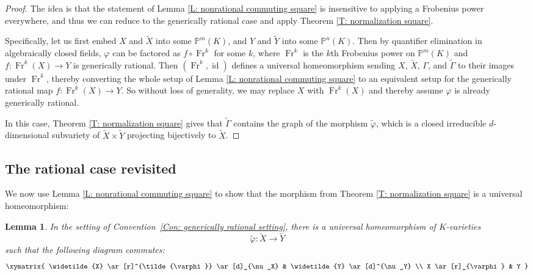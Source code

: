 \documentclass{amsart}
\newtheorem{lemma}[theorem]{Lemma}
\theoremstyle{definition}
\begin{document}
\begin{proof}
The idea is that the statement of Lemma \ref{L: nonrational commuting square} is insensitive to applying a Frobenius power everywhere, and thus we can reduce to the generically rational case and apply Theorem \ref{T: normalization square}.

Specifically, let us first embed $X$ and $\widetilde X$ into some $\mathbb P^m(K)$, and $Y$ and $\widetilde Y$ into some $\mathbb P^n(K)$. Then by quantifier elimination in algebraically closed fields, $\varphi$ can be factored as $f\circ\operatorname{Fr}^k$ for some $k$, where $\operatorname{Fr
}^k$ is the $k$th Frobenius power on $\mathbb P^m(K)$ and $f:\operatorname{Fr}^k(X)\rightarrow Y$ is generically rational. Then $(\operatorname{Fr}^k,\operatorname{id})$ defines a universal homeomorphism sending $X$, $\widetilde{X}$, $\Gamma$, and $\widetilde\Gamma$ to their images under $\operatorname{Fr}^k$, thereby converting the whole setup of Lemma \ref{L: nonrational commuting square} to an equivalent setup for the generically rational map $f:\operatorname{Fr}^k(X)\rightarrow Y$. So without loss of generality, we may replace $X$ with $\operatorname{Fr}^k(X)$ and thereby assume $\varphi$ is already generically rational.

In this case, Theorem \ref{T: normalization square} gives that $\widetilde\Gamma$ contains the graph of the morphism $\widetilde\varphi$, which is a closed irreducible $d$-dimensional subvariety of $\widetilde X\times\widetilde Y$ projecting bijectively to $\widetilde X$.
\end{proof}

\subsection{The rational case revisited}

We now use Lemma \ref{L: nonrational commuting square} to show that the morphism from Theorem \ref{T: normalization square} is a universal homeomorphism:

\begin{lemma}\label{L: gen rat full}
    In the setting of Convention~\ref{Con: generically rational setting}, there is a universal homeomorphism of $K$-varieties
\[
\tilde{\varphi} : \widetilde{X} \to \widetilde{Y}
\]
such that the following diagram commutes:
\[
\xymatrix{
\widetilde{X} \ar[r]^{\tilde{\varphi}} \ar[d]_{\nu_X} & \widetilde{Y} \ar[d]^{\nu_Y} \\
X \ar[r]_{\varphi} & Y
}
\]
\end{lemma}
\end{document}
